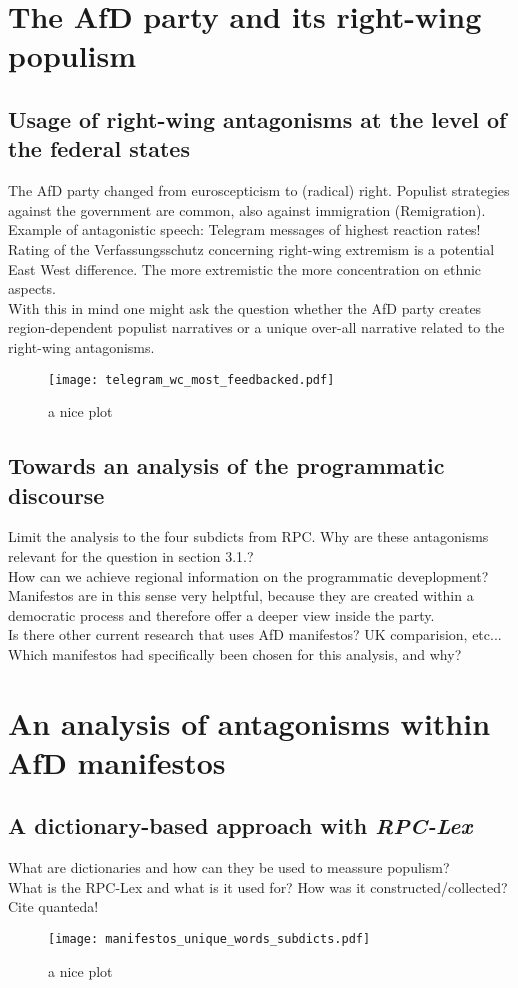\documentclass[a4paper]{scrreprt}
\begin{document}
\chapter{The AfD party and its right-wing populism}
\section{Usage of right-wing antagonisms at the level of the federal states}
The AfD party changed from euroscepticism to (radical) right. Populist strategies against the government are common, also against immigration (Remigration).\\
Example of antagonistic speech: Telegram messages of highest reaction rates!\\
Rating of the Verfassungsschutz concerning right-wing extremism is a potential East West difference. The more extremistic the more concentration on ethnic aspects.\\
With this in mind one might ask the question whether the AfD party creates region-dependent populist narratives or a unique over-all narrative related to the right-wing antagonisms.
\begin{figure}
    \centering
    \texttt{[image: telegram\_wc\_most\_feedbacked.pdf]}
    \caption{a nice plot}
\end{figure}
\section{Towards an analysis of the programmatic discourse}
Limit the analysis to the four subdicts from RPC. Why are these antagonisms relevant for the question in section 3.1.?\\
How can we achieve regional information on the programmatic deveplopment? Manifestos are in this sense very helptful, because they are created within a democratic process and therefore offer a deeper view inside the party.\\
Is there other current research that uses AfD manifestos? UK comparision, etc...\\
Which manifestos had specifically been chosen for this analysis, and why?
\chapter{An analysis of antagonisms within AfD manifestos}
\section{A dictionary-based approach with \em RPC-Lex}
What are dictionaries and how can they be used to meassure populism?\\
What is the RPC-Lex and what is it used for? How was it constructed/collected?\\
Cite quanteda!
\begin{figure}
    \centering
    \texttt{[image: manifestos\_unique\_words\_subdicts.pdf]}
    \caption{a nice plot}
\end{figure}
\end{document}
